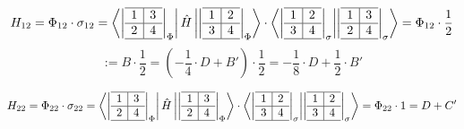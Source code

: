 \documentclass[12pt,a4paper]{article}
\begin{document}
$$H_{12} = \Phi_{12} \cdot \sigma_{12}= \bra{
\left|
  \begin{array}{c|c}
  \hline 
    1 & 3 \\ \hline 
    2 & 4 \\
    \hline 
  \end{array}
\right| _{\Phi}
} \hat{H} \ket{
\left|
  \begin{array}{c|c}
  \hline 
    1 & 2 \\ \hline 
    3 & 4 \\
    \hline 
  \end{array}
\right| _{\Phi}
} \cdot \bra{\left|
  \begin{array}{c|c}
  \hline 
    1 & 2 \\ \hline 
    3 & 4 \\
    \hline 
  \end{array}
\right|_\sigma} \ket{\left|
  \begin{array}{c|c}
  \hline 
    1 & 3 \\ \hline 
    2 & 4 \\
    \hline 
  \end{array}
\right|_\sigma} = \Phi_{12}\cdot \frac{1}{2} $$ 
$$:= B \cdot \frac{1}{2} = \left( -\frac{1}{4}\cdot D + B' \right) \cdot \frac{1}{2} = - \frac{1}{8} \cdot D + \frac{1}{2} \cdot B'
$$



$$H_{22} = \Phi_{22} \cdot \sigma_{22}= \bra{
\left|
  \begin{array}{c|c}
  \hline 
    1 & 3 \\ \hline 
    2 & 4 \\
    \hline 
  \end{array}
\right| _{\Phi}
} \hat{H} \ket{
\left|
  \begin{array}{c|c}
  \hline 
    1 & 3 \\ \hline 
    2 & 4 \\
    \hline 
  \end{array}
\right| _{\Phi}
} \cdot \bra{\left|
  \begin{array}{c|c}
  \hline 
    1 & 2 \\ \hline 
    3 & 4 \\
    \hline 
  \end{array}
\right|_\sigma} \ket{\left|
  \begin{array}{c|c}
  \hline 
    1 & 2 \\ \hline 
    3 & 4 \\
    \hline 
  \end{array}
\right|_\sigma} = \Phi_{22}\cdot 1 = D + C'
$$
\end{document}
